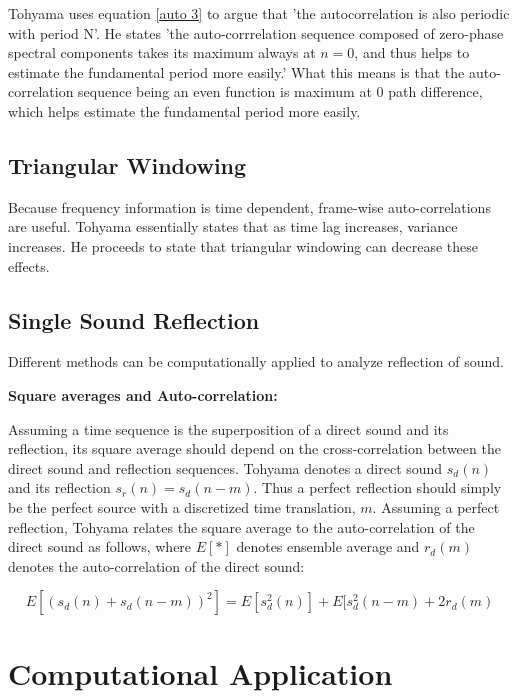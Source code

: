 \documentclass[12pt]{article}
\begin{document}
Tohyama uses equation \ref{auto 3} to argue that 'the autocorrelation is also periodic with period N'\cite{aa}. He states 'the auto-corrrelation sequence composed of zero-phase spectral components takes its maximum always at $n = 0$, and thus helps to estimate the fundamental period more easily.'\cite{aa} What this means is that the auto-correlation sequence being an even function is maximum at 0 path difference, which helps estimate the fundamental period more easily.

\subsection{Triangular Windowing}

Because frequency information is time dependent, frame-wise auto-correlations are useful. Tohyama essentially states that as time lag increases, variance increases\cite{aa}. He proceeds to state that triangular windowing can decrease these effects.\cite{aa}

\subsection{Single Sound Reflection}


Different methods can be computationally applied to analyze reflection of sound.\newline

\textbf{Square averages and Auto-correlation:}

Assuming a time sequence is the superposition of a direct sound and its reflection, its square average should depend on the cross-correlation between the direct sound and reflection sequences.\cite{aa} Tohyama denotes a direct sound $s_d(n)$ and its reflection $s_r(n) = s_d(n-m)$\cite{aa}. Thus a perfect reflection should simply be the perfect source with a discretized time translation, $m$. Assuming a perfect reflection, Tohyama relates the square average to the auto-correlation of the direct sound as follows, where $E[*]$ denotes ensemble average and $r_d(m)$ denotes the auto-correlation of the direct sound:

\begin{equation}
E[(s_d(n) + s_d(n-m))^2] = E[s^2_d(n)] + E[s^2_d(n-m) + 2r_d(m)\label{squareaverage}
\end{equation}

\section{Computational Application}
\end{document}
